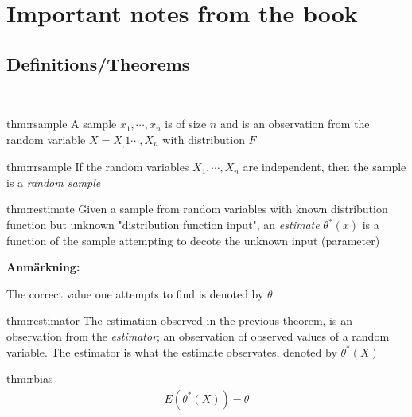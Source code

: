 \section{Important notes from the book}\par
\subsection{Definitions/Theorems}\hfill\\\par
\begin{theo}{thm:rsample}
  A sample $x_1,\cdots,x_n$ is of size $n$ and is an observation from the random variable $X = X_,1\cdots,X_n$ with distribution $F$
\end{theo}
\par\bigskip
\begin{theo}{thm:rrsample}
  If the random variables $X_1,\cdots,X_n$ are independent, then the sample is a \textit{random sample}
\end{theo}
\par\bigskip
\begin{theo}{thm:restimate}
  Given a sample from random variables with known distribution function but unknown "distribution function input", an \textit{estimate} $\theta^*(x)$ is a function of the sample attempting to decote the unknown input (parameter)
\end{theo}
\par\bigskip
\noindent\textbf{Anmärkning:}\par
\noindent The correct value one attempts to find is denoted by $\theta$
\par\bigskip
\begin{theo}[Estimator]{thm:restimator}
  The estimation observed in the previous theorem, is an observation from the \textit{estimator}; an observation of observed values of a random variable. The estimator is what the estimate observates, denoted by $\theta^*(X)$ 
\end{theo}
\par\bigskip
\begin{theo}[Bias]{thm:rbias}
  \begin{equation*}
    \begin{gathered}
      E(\theta^*(X))-\theta
    \end{gathered}
  \end{equation*}
\end{theo}
\par\bigskip
